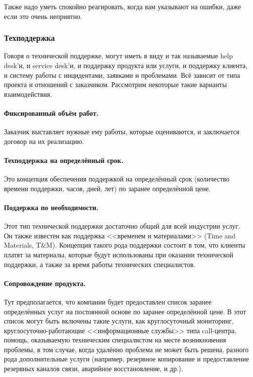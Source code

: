 \documentclass{../../text-style}
\begin{document}
Также надо уметь спокойно реагировать, когда вам указывают на ошибки, даже если это очень неприятно.

\subsubsection{Техподдержка}

Говоря о технической поддержке, могут иметь в виду и так называемые help desk’и, и service desk’и, и поддержку продукта или услуги, и поддержку клиента, и систему работы с инцидентами, заявками и проблемами. Всё зависит от типа проекта и отношений с заказчиком. Рассмотрим некоторые такие варианты взаимодействия.

\paragraph{Фиксированный объём работ.} Заказчик выставляет нужные ему работы, которые оцениваются, и заключается договор на их реализацию.

\paragraph{Техподдержка на определённый срок.} Это концепция обеспечения поддержкой на определённый срок (количество времени поддержки, часов, дней, лет) по заранее определённой цене.

\paragraph{Поддержка по необходимости.} Этот тип технической поддержки достаточно общий для всей индустрии услуг. Он также известен как поддержка <<временем и материалами>> (Time and Materials, T\&M). Концепция такого рода поддержки состоит в том, что клиенты платят за материалы, которые будут использованы при оказании технической поддержки, а также за время работы технических специалистов.

\paragraph{Сопровождение продукта.} Тут предполагается, что компании будет предоставлен список заранее определённых услуг на постоянной основе по заранее определённой цене. В этот список могут быть включены такие услуги, как круглосуточный мониторинг, круглосуточно-работающие <<информационные службы>> типа call-центра, помощь, оказываемую техническим специалистом на месте возникновения проблемы, в том случае, когда удалённо проблема не может быть решена, разного рода дополнительные услуги (например, резервное копирование и предоставление резервных каналов связи, аварийное восстановление, и др.).
\end{document}

